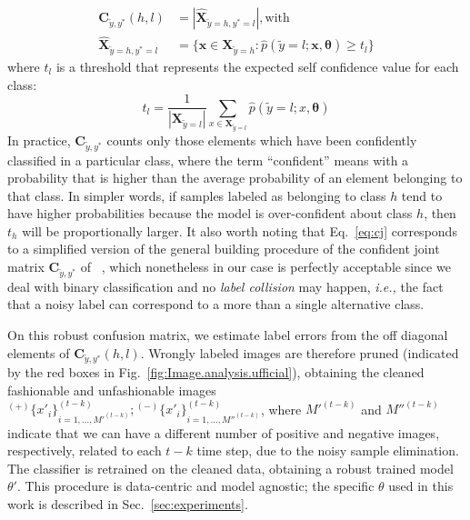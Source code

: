 \documentclass[runningheads]{llncs}
\begin{document}
\begin{equation}
\begin{split}
 \mathbf{C}_{\tilde{y},y^*}(h,l)&=|\mathbf{\hat{X}}_{\tilde{y}=h,y^*=l}|, \text{with}  \\
 \mathbf{\hat{X}}_{\tilde{y}=h,y^*=l}&=\Bigg\{ \mathbf{x} \in \mathbf{X}_{\tilde{y}=h}:\hat{p}(\tilde{y}=l;\mathbf{x},\mathbf{\theta})\ge t_l \Bigg\}          \label{eq:cj}
\end{split}
\end{equation}
where $t_l$ is a threshold that represents the expected self confidence value for each class:
\begin{equation}
    t_l=\frac{1}{|\mathbf{X}_{\tilde{y}=l}|}\sum_{x\in \mathbf{X}_{\tilde{y}=l}}\hat{p}(\tilde{y}=l;x,\mathbf{\theta})
\end{equation}\label{eq:tj}
In practice, $ \mathbf{C}_{\tilde{y},y^*}$ counts only those elements which have been confidently classified in a particular class, where the term ``confident'' means with a probability that is higher than the average probability of an element belonging to that class. In simpler words, if samples labeled as belonging to class $h$ tend to have higher probabilities because the model is over-confident about class $h$, then $t_h$ will be proportionally larger.
It also worth noting that Eq.~\ref{eq:cj} corresponds to a simplified version of the general building procedure of the confident joint matrix $ \mathbf{C}_{\tilde{y},y^*}$ of ~\cite{northcutt2021confident}, which nonetheless in our case is perfectly acceptable since we deal with binary classification and no \emph{label collision} may happen, \textit{i.e.,} the fact that a noisy label can correspond to a more than a single alternative class. 

On this robust confusion matrix, we estimate label errors from the off diagonal elements of $\mathbf{C}_{\tilde{y},y^*}(h,l)$. Wrongly labeled images are therefore pruned (indicated by the red boxes in Fig.~\ref{fig:Image.analysis.ufficial}), obtaining the cleaned fashionable and unfashionable images ${}^{(+)}\{x'_i\}_{i=1,\ldots,M'^{(t-k)}}^{(t-k)}; {}^{(-)}\{x'_i\}_{i=1,\ldots,M''^{(t-k)}}^{(t-k)}$, where $M'^{(t-k)}$ and $M''^{(t-k)}$ indicate that we can have a different number of positive and negative images, respectively,  related to each $t-k$ time step, due to the noisy sample elimination. The classifier is retrained on the cleaned data, obtaining a robust trained model $\theta'$. This procedure is data-centric and model agnostic; the specific $\theta$ used in this work is described in Sec.~\ref{sec:experiments}.
\end{document}
